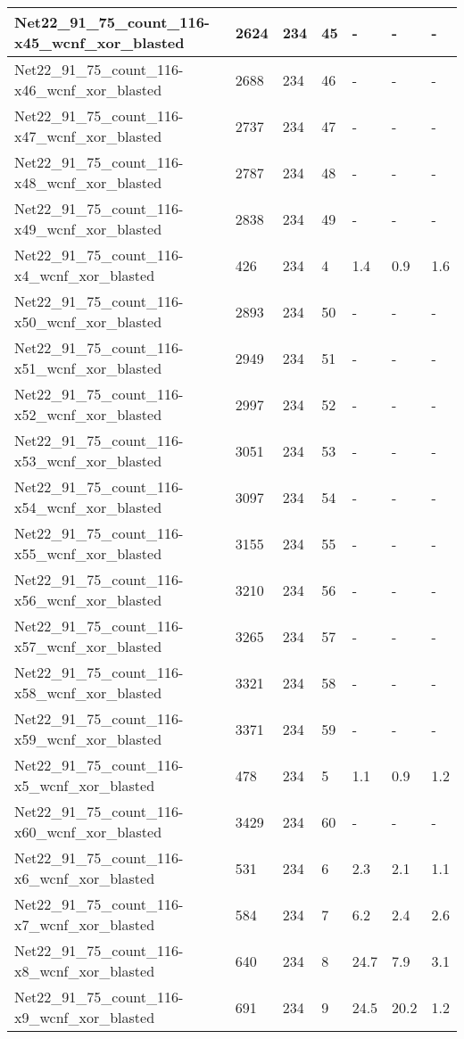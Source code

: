 \begin{scriptsize}
\begin{longtable}{|p{5cm}|l|l|l|l|l|l|}
Net22\_91\_75\_count\_116-x45\_wcnf\_xor\_blasted&2624&234&45&-&-&- \\ \hline 
Net22\_91\_75\_count\_116-x46\_wcnf\_xor\_blasted&2688&234&46&-&-&- \\ \hline 
Net22\_91\_75\_count\_116-x47\_wcnf\_xor\_blasted&2737&234&47&-&-&- \\ \hline 
Net22\_91\_75\_count\_116-x48\_wcnf\_xor\_blasted&2787&234&48&-&-&- \\ \hline 
Net22\_91\_75\_count\_116-x49\_wcnf\_xor\_blasted&2838&234&49&-&-&- \\ \hline 
Net22\_91\_75\_count\_116-x4\_wcnf\_xor\_blasted&426&234&4&1.4&0.9&1.6 \\ \hline 
Net22\_91\_75\_count\_116-x50\_wcnf\_xor\_blasted&2893&234&50&-&-&- \\ \hline 
Net22\_91\_75\_count\_116-x51\_wcnf\_xor\_blasted&2949&234&51&-&-&- \\ \hline 
Net22\_91\_75\_count\_116-x52\_wcnf\_xor\_blasted&2997&234&52&-&-&- \\ \hline 
Net22\_91\_75\_count\_116-x53\_wcnf\_xor\_blasted&3051&234&53&-&-&- \\ \hline 
Net22\_91\_75\_count\_116-x54\_wcnf\_xor\_blasted&3097&234&54&-&-&- \\ \hline 
Net22\_91\_75\_count\_116-x55\_wcnf\_xor\_blasted&3155&234&55&-&-&- \\ \hline 
Net22\_91\_75\_count\_116-x56\_wcnf\_xor\_blasted&3210&234&56&-&-&- \\ \hline 
Net22\_91\_75\_count\_116-x57\_wcnf\_xor\_blasted&3265&234&57&-&-&- \\ \hline 
Net22\_91\_75\_count\_116-x58\_wcnf\_xor\_blasted&3321&234&58&-&-&- \\ \hline 
Net22\_91\_75\_count\_116-x59\_wcnf\_xor\_blasted&3371&234&59&-&-&- \\ \hline 
Net22\_91\_75\_count\_116-x5\_wcnf\_xor\_blasted&478&234&5&1.1&0.9&1.2 \\ \hline 
Net22\_91\_75\_count\_116-x60\_wcnf\_xor\_blasted&3429&234&60&-&-&- \\ \hline 
Net22\_91\_75\_count\_116-x6\_wcnf\_xor\_blasted&531&234&6&2.3&2.1&1.1 \\ \hline 
Net22\_91\_75\_count\_116-x7\_wcnf\_xor\_blasted&584&234&7&6.2&2.4&2.6 \\ \hline 
Net22\_91\_75\_count\_116-x8\_wcnf\_xor\_blasted&640&234&8&24.7&7.9&3.1 \\ \hline 
Net22\_91\_75\_count\_116-x9\_wcnf\_xor\_blasted&691&234&9&24.5&20.2&1.2 \\ \hline 

\end{longtable}
\end{scriptsize}
